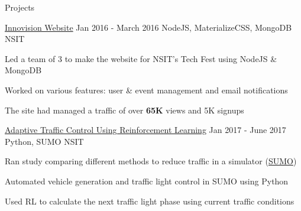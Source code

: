 \documentclass{resume} %
\begin{document}

\begin{rSection}{Projects}



    \begin{rSubsection}
        {\href{https://github.com/rohit-smpx/inno}{Innovision Website}}
            {Jan 2016 - March 2016}
        {NodeJS, MaterializeCSS, MongoDB}
            {NSIT}

        \item Led a team of 3 to make the website for NSIT’s Tech Fest using NodeJS \& MongoDB
        \item Worked on various features: user \& event management and email notifications
        \item The site had managed a traffic of over \textbf{65K} views and 5K signups
    \end{rSubsection}    

    \begin{rSubsection}
        {\href{https://github.com/rohit-smpx/trafficRL}{Adaptive Traffic Control Using Reinforcement Learning}}
            {Jan 2017 - June 2017}
        {Python, SUMO}
            {NSIT}

        \item Ran study comparing different methods to reduce traffic in a simulator (\href{https://sumo.dlr.de}{SUMO})
        \item Automated vehicle generation and traffic light control in SUMO using Python
        \item Used RL to calculate the next traffic light phase using current traffic conditions
    \end{rSubsection}
    

\end{rSection}
\end{document}
